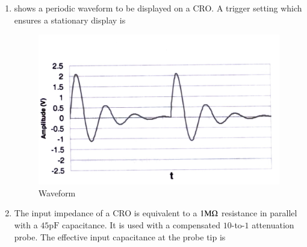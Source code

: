 \documentclass[journal,12pt,onecolumn]{IEEEtran}
\theoremstyle{remark}
\begin{document}
\begin{enumerate}
\item {} shows a periodic waveform to be displayed on a CRO. A trigger setting which ensures a stationary display is\par \hfill{}
\begin{figure}[H]
    \centering
    \includegraphics[width=0.5\columnwidth]{Figs/Q-15.jpg}
    \caption{Waveform}
    \label{fig:placeholder_5}
\end{figure}
\begin{enumerate}
\end{enumerate}

 
\item The input impedance of a CRO is equivalent to a $1\text{M}\ohm$ resistance in parallel with a $45\text{pF}$ capacitance. It is used with a compensated $10$-to-$1$ attenuation probe. The effective input capacitance at the probe tip is \par \hfill{}
\begin{enumerate}
\end{enumerate}


\end{enumerate}
\end{document}
